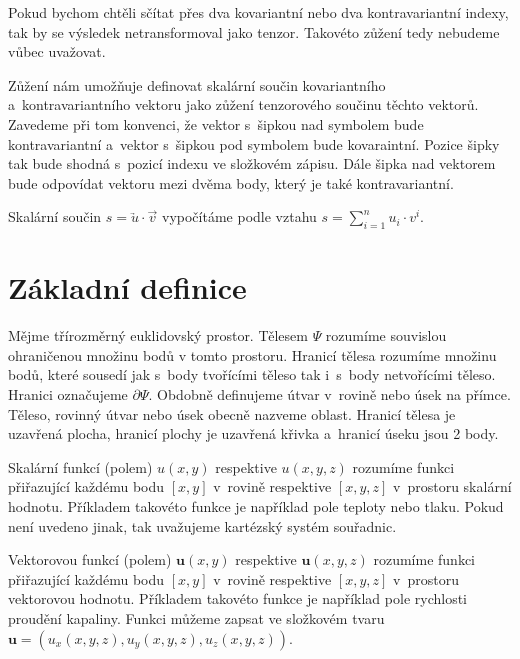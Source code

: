 \documentclass{book}
\newcommand{\vect}[1]{\boldsymbol{#1}}
\newcommand{\kovarvect}[1]{\underrightarrow{#1}}
\newcommand{\kontravect}[1]{\overrightarrow{#1}}
\begin{document}
Pokud bychom chtěli sčítat přes dva kovariantní nebo dva kontravariantní indexy, tak by se výsledek netransformoval jako tenzor. Takovéto zůžení tedy nebudeme
vůbec uvažovat.

Zůžení nám umožňuje definovat skalární součin kovariantního a~kontravariantního vektoru jako zůžení tenzorového součinu těchto vektorů. Zavedeme při tom
konvenci, že vektor s~šipkou nad symbolem bude kontravariantní a~vektor s~šipkou pod symbolem bude kovaraintní. Pozice šipky tak bude shodná s~pozicí
indexu ve složkovém zápisu. Dále šipka nad vektorem bude odpovídat vektoru mezi dvěma body, který je také kontravariantní.

\begin{fact}
Skalární součin \(s = \kovarvect{u} \cdot \kontravect{v}\) vypočítáme podle vztahu \(s = \sum_{i=1}^n u_i \cdot v^i\).
\end{fact}

\section{Základní definice}

Mějme třírozměrný euklidovský prostor. Tělesem \(\Psi\) rozumíme souvislou ohraničenou množinu bodů v tomto prostoru. Hranicí tělesa rozumíme množinu bodů, které sousedí jak s~body tvořícími těleso tak i~s~body netvořícími těleso. Hranici označujeme \(\partial \Psi\). Obdobně definujeme útvar v~rovině nebo úsek na přímce. Těleso, rovinný útvar nebo úsek obecně nazveme oblast. Hranicí tělesa je uzavřená plocha, hranicí plochy je uzavřená křivka a~hranicí úseku jsou 2 body. 


Skalární funkcí (polem) \(u(x, y)\) respektive \(u(x, y, z)\) rozumíme funkci přiřazující každému bodu \([x, y]\) v~rovině respektive \([x, y, z]\) v~prostoru skalární hodnotu. Příkladem takovéto funkce je například pole teploty nebo tlaku. Pokud není uvedeno jinak, tak uvažujeme kartézský systém souřadnic. 

Vektorovou funkcí (polem) \(\vect{u}(x, y)\) respektive \(\vect{u}(x, y, z)\) rozumíme funkci přiřazující každému bodu \([x, y]\)
 v~rovině respektive \([x, y, z]\) v~prostoru vektorovou hodnotu. Příkladem takovéto funkce je například pole rychlosti proudění kapaliny. Funkci můžeme zapsat ve složkovém tvaru \(\vect{u}=(u_x(x, y, z), u_y(x, y, z), u_z(x, y, z))\).
\end{document}
